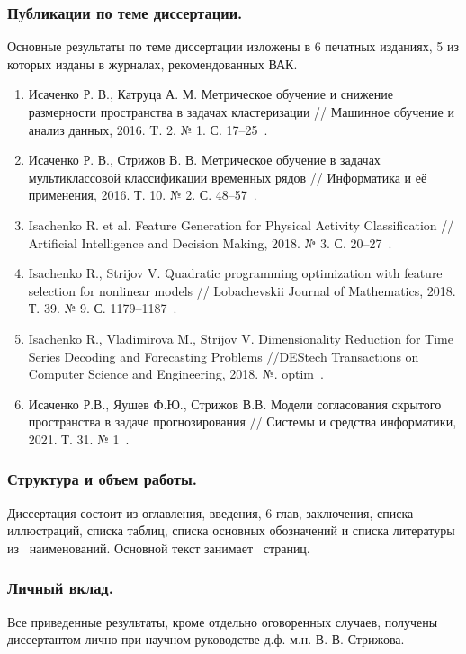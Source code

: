 \subsubsection{Публикации по теме диссертации.}
Основные результаты по теме диссертации изложены в 6 печатных изданиях, 5 из которых изданы в журналах, рекомендованных ВАК.
\begin{enumerate}
	\item Исаченко Р. В., Катруца А. М. Метрическое обучение и снижение размерности пространства в задачах кластеризации // Машинное обучение и анализ данных, 2016. T. 2. № 1. С. 17--25~\cite{isachenko2016metricjmlda}.
	\item Исаченко Р. В., Стрижов В. В. Метрическое обучение в задачах мультиклассовой классификации временных рядов // Информатика и её применения, 2016. Т. 10. № 2. С. 48--57~\cite{isachenko2016metricia}.
	\item Isachenko R. et al. Feature Generation for Physical Activity Classification // Artificial Intelligence and Decision Making, 2018. № 3. С. 20--27~\cite{isachenko2018feature}.
	\item Isachenko R., Strijov V. Quadratic programming optimization with feature selection for nonlinear models // Lobachevskii Journal of Mathematics, 2018. Т. 39. № 9. С. 1179--1187~\cite{isachenko2018quadratic}.
	\item Isachenko R., Vladimirova M., Strijov V. Dimensionality Reduction for Time Series Decoding and Forecasting Problems //DEStech Transactions on Computer Science and Engineering, 2018. №. optim~\cite{isachenko2018plsdestech}.
	\item Исаченко Р.В., Яушев Ф.Ю., Стрижов В.В. Модели согласования скрытого пространства в задаче прогнозирования // Системы и средства информатики, 2021. Т. 31. № 1~\cite{isachenko2021concordance}.
\end{enumerate}

\subsubsection{Структура и объем работы.}
Диссертация состоит из оглавления, введения, 6 глав, заключения, списка иллюстраций, списка таблиц, списка основных обозначений и списка литературы из~ наименований. 
Основной текст занимает~\pageref{LastPage} страниц.

\subsubsection{Личный вклад.}
Все приведенные результаты, кроме отдельно оговоренных случаев, получены диссертантом лично при научном руководстве д.ф.-м.н. В. В. Стрижова.

